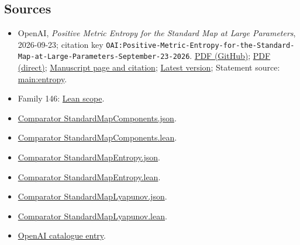 \documentclass[11pt]{article}
\begin{document}
\subsection{Sources}
\begin{itemize}
\item OpenAI, \emph{Positive Metric Entropy for the Standard Map at Large Parameters}, 2026-09-23; citation key \texttt{OAI:Positive-Metric-Entropy-for-the-Standard-Map-at-Large-Parameters-September-23-2026}. \href{https://github.com/openai/math/blob/adc7f1241b42e322a6451854ab7e4b4c146bf78a/preprints/Positive-Metric-Entropy-for-the-Standard-Map-at-Large-Parameters-September-23-2026/paper.pdf}{PDF (GitHub)}; \href{https://github.com/openai/math/raw/adc7f1241b42e322a6451854ab7e4b4c146bf78a/preprints/Positive-Metric-Entropy-for-the-Standard-Map-at-Large-Parameters-September-23-2026/paper.pdf}{PDF (direct)}; \href{https://github.com/openai/math/blob/adc7f1241b42e322a6451854ab7e4b4c146bf78a/preprints/Positive-Metric-Entropy-for-the-Standard-Map-at-Large-Parameters-September-23-2026/README.md}{Manuscript page and citation}; \href{https://github.com/openai/math/blob/main/preprints/Positive-Metric-Entropy-for-the-Standard-Map-at-Large-Parameters-September-23-2026/paper.pdf}{Latest version}; Statement source: \href{https://github.com/openai/math/blob/adc7f1241b42e322a6451854ab7e4b4c146bf78a/preprints/Positive-Metric-Entropy-for-the-Standard-Map-at-Large-Parameters-September-23-2026/build/sections/introduction.tex\#L15}{main:entropy}.
\item Family 146: \href{https://github.com/openai/math/blob/adc7f1241b42e322a6451854ab7e4b4c146bf78a/lean/docs/146.md}{Lean scope}.
\item \href{https://github.com/openai/math/blob/adc7f1241b42e322a6451854ab7e4b4c146bf78a/lean/ComparatorChallenges/StandardMapComponents.json}{Comparator StandardMapComponents.json}.
\item \href{https://github.com/openai/math/blob/adc7f1241b42e322a6451854ab7e4b4c146bf78a/lean/ComparatorChallenges/StandardMapComponents.lean}{Comparator StandardMapComponents.lean}.
\item \href{https://github.com/openai/math/blob/adc7f1241b42e322a6451854ab7e4b4c146bf78a/lean/ComparatorChallenges/StandardMapEntropy.json}{Comparator StandardMapEntropy.json}.
\item \href{https://github.com/openai/math/blob/adc7f1241b42e322a6451854ab7e4b4c146bf78a/lean/ComparatorChallenges/StandardMapEntropy.lean}{Comparator StandardMapEntropy.lean}.
\item \href{https://github.com/openai/math/blob/adc7f1241b42e322a6451854ab7e4b4c146bf78a/lean/ComparatorChallenges/StandardMapLyapunov.json}{Comparator StandardMapLyapunov.json}.
\item \href{https://github.com/openai/math/blob/adc7f1241b42e322a6451854ab7e4b4c146bf78a/lean/ComparatorChallenges/StandardMapLyapunov.lean}{Comparator StandardMapLyapunov.lean}.
\item \href{https://github.com/openai/math/blob/adc7f1241b42e322a6451854ab7e4b4c146bf78a/CONTENTS.md}{OpenAI catalogue entry}.
\end{itemize}
\end{document}
